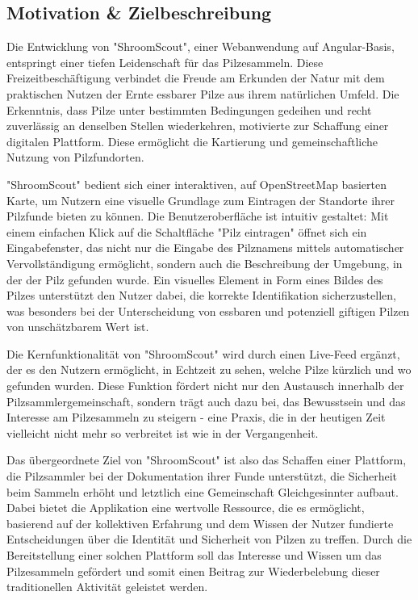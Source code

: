 \documentclass[../main.tex]{subfiles}
\begin{document}
\subsection{Motivation \& Zielbeschreibung}
Die Entwicklung von "ShroomScout", einer Webanwendung auf Angular-Basis, entspringt einer tiefen Leidenschaft 
für das Pilzesammeln. Diese Freizeitbeschäftigung verbindet die Freude am Erkunden der Natur mit dem praktischen 
Nutzen der Ernte essbarer Pilze aus ihrem natürlichen Umfeld. Die Erkenntnis, dass Pilze unter bestimmten Bedingungen 
gedeihen und recht zuverlässig an denselben Stellen wiederkehren, motivierte zur Schaffung einer digitalen Plattform. Diese 
ermöglicht die Kartierung und gemeinschaftliche Nutzung von Pilzfundorten.

"ShroomScout" bedient sich einer interaktiven, auf OpenStreetMap basierten Karte, um Nutzern eine visuelle 
Grundlage zum Eintragen der Standorte ihrer Pilzfunde bieten zu können. Die Benutzeroberfläche ist intuitiv gestaltet: 
Mit einem einfachen Klick auf die Schaltfläche "Pilz eintragen" öffnet sich ein Eingabefenster, das nicht nur die 
Eingabe des Pilznamens mittels automatischer Vervollständigung ermöglicht, sondern auch die Beschreibung der Umgebung, 
in der der Pilz gefunden wurde. Ein visuelles Element in Form eines Bildes des Pilzes unterstützt den Nutzer dabei, 
die korrekte Identifikation sicherzustellen, was besonders bei der Unterscheidung von essbaren und potenziell giftigen 
Pilzen von unschätzbarem Wert ist.

Die Kernfunktionalität von "ShroomScout" wird durch einen Live-Feed ergänzt, der es den Nutzern ermöglicht, 
in Echtzeit zu sehen, welche Pilze kürzlich und wo gefunden wurden. Diese Funktion fördert nicht nur den 
Austausch innerhalb der Pilzsammlergemeinschaft, sondern trägt auch dazu bei, das Bewusstsein und das 
Interesse am Pilzesammeln zu steigern - eine Praxis, die in der heutigen Zeit vielleicht nicht mehr so 
verbreitet ist wie in der Vergangenheit.

Das übergeordnete Ziel von "ShroomScout" ist also das Schaffen einer Plattform, die Pilzsammler bei der Dokumentation 
ihrer Funde unterstützt, die Sicherheit beim Sammeln erhöht und letztlich eine Gemeinschaft Gleichgesinnter 
aufbaut. Dabei bietet die Applikation eine wertvolle Ressource, die es ermöglicht, basierend auf der kollektiven Erfahrung 
und dem Wissen der Nutzer fundierte Entscheidungen über die Identität und Sicherheit von Pilzen zu treffen. Durch die 
Bereitstellung einer solchen Plattform soll das Interesse und Wissen um das Pilzesammeln gefördert und somit einen Beitrag 
zur Wiederbelebung dieser traditionellen Aktivität geleistet werden.
\end{document}
